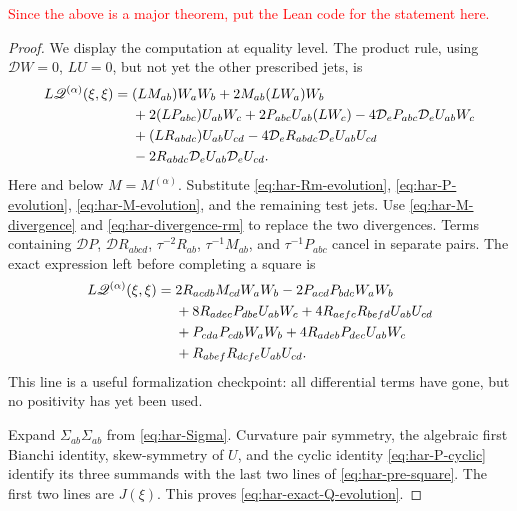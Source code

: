 \documentclass[10pt]{coll-l}
\theoremstyle{definition}
\theoremstyle{remark}
\numberwithin{section}{chapter}
\numberwithin{equation}{chapter}
\begin{document}
\textcolor{red}{Since the above is a major theorem, put the Lean code for the statement here.}

\begin{proof}
We display the computation at equality level.  The product rule, using
$\mathcal DW=0$, $LU=0$, but not yet the other prescribed jets, is
\begin{align}
 L\mathscr Q^{(\alpha)}(\xi,\xi)={}&
 (LM_{ab})W_aW_b+2M_{ab}(LW_a)W_b                       \notag\\
 &+2(LP_{abc})U_{ab}W_c+2P_{abc}U_{ab}(LW_c)
      -4\mathcal D_eP_{abc}\mathcal D_eU_{ab}W_c        \notag\\
 &+(LR_{abdc})U_{ab}U_{cd}
      -4\mathcal D_eR_{abdc}\mathcal D_eU_{ab}U_{cd}   \notag\\
 &-2R_{abdc}\mathcal D_eU_{ab}\mathcal D_eU_{cd}.       \label{eq:har-raw-Q-product}
\end{align}
Here and below $M=M^{(\alpha)}$.  Substitute
\eqref{eq:har-Rm-evolution}, \eqref{eq:har-P-evolution},
\eqref{eq:har-M-evolution}, and the remaining test jets.  Use
\eqref{eq:har-M-divergence} and \eqref{eq:har-divergence-rm} to replace the
two divergences.  Terms containing $\mathcal DP$, $\mathcal DR_{abcd}$,
$\tau^{-2}R_{ab}$, $\tau^{-1}M_{ab}$, and $\tau^{-1}P_{abc}$ cancel in
separate pairs.  The exact expression left before completing a square is
\begin{align}
 L\mathscr Q^{(\alpha)}(\xi,\xi)={}&
 2R_{acdb}M_{cd}W_aW_b-2P_{acd}P_{bdc}W_aW_b            \notag\\
 &+8R_{adec}P_{dbe}U_{ab}W_c
      +4R_{aefc}R_{befd}U_{ab}U_{cd}                    \notag\\
 &+P_{cda}P_{cdb}W_aW_b
      +4R_{adeb}P_{dec}U_{ab}W_c                        \notag\\
 &+R_{abef}R_{dcfe}U_{ab}U_{cd}.                        \label{eq:har-pre-square}
\end{align}
This line is a useful formalization checkpoint: all differential terms have
gone, but no positivity has yet been used.

Expand $\Sigma_{ab}\Sigma_{ab}$ from \eqref{eq:har-Sigma}.  Curvature pair
symmetry, the algebraic first Bianchi identity, skew-symmetry of $U$, and the
cyclic identity \eqref{eq:har-P-cyclic} identify its three summands with the
last two lines of \eqref{eq:har-pre-square}.  The first two lines are
$J(\xi)$.  This proves \eqref{eq:har-exact-Q-evolution}.
\end{proof}
\end{document}
